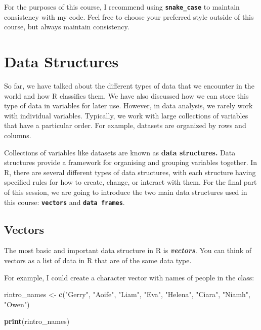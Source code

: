 \documentclass[
]{book}
\newenvironment{Shaded}{\begin{snugshade}}{\end{snugshade}}
\newcommand{\FunctionTok}[1]{\textcolor[rgb]{0.13,0.29,0.53}{\textbf{#1}}}
\newcommand{\NormalTok}[1]{#1}
\newcommand{\OtherTok}[1]{\textcolor[rgb]{0.56,0.35,0.01}{#1}}
\newcommand{\StringTok}[1]{\textcolor[rgb]{0.31,0.60,0.02}{#1}}
\begin{document}
For the purposes of this course, I recommend using \textbf{\texttt{snake\_case}} to maintain consistency with my code. Feel free to choose your preferred style outside of this course, but always maintain consistency.

\section{Data Structures}\label{data-structures}

So far, we have talked about the different types of data that we encounter in the world and how R classifies them. We have also discussed how we can store this type of data in variables for later use. However, in data analysis, we rarely work with individual variables. Typically, we work with large collections of variables that have a particular order. For example, datasets are organized by rows and columns.

Collections of variables like datasets are known as \textbf{data structures.} Data structures provide a framework for organising and grouping variables together. In R, there are several different types of data structures, with each structure having specified rules for how to create, change, or interact with them. For the final part of this session, we are going to introduce the two main data structures used in this course: \textbf{\texttt{vectors}} and \textbf{\texttt{data\ frames}}.

\subsection{Vectors}\label{vectors}

The most basic and important data structure in R is \textbf{\emph{vectors}}. You can think of vectors as a list of data in R that are of the same data type.

For example, I could create a character vector with names of people in the class:

\begin{Shaded}
\begin{Highlighting}[]
\NormalTok{rintro\_names }\OtherTok{\textless{}{-}} \FunctionTok{c}\NormalTok{(}\StringTok{"Gerry"}\NormalTok{, }\StringTok{"Aoife"}\NormalTok{, }\StringTok{"Liam"}\NormalTok{, }\StringTok{"Eva"}\NormalTok{, }\StringTok{"Helena"}\NormalTok{, }\StringTok{"Ciara"}\NormalTok{, }\StringTok{"Niamh"}\NormalTok{, }\StringTok{"Owen"}\NormalTok{)}


\FunctionTok{print}\NormalTok{(rintro\_names)}
\end{Highlighting}
\end{Shaded}
\end{document}
